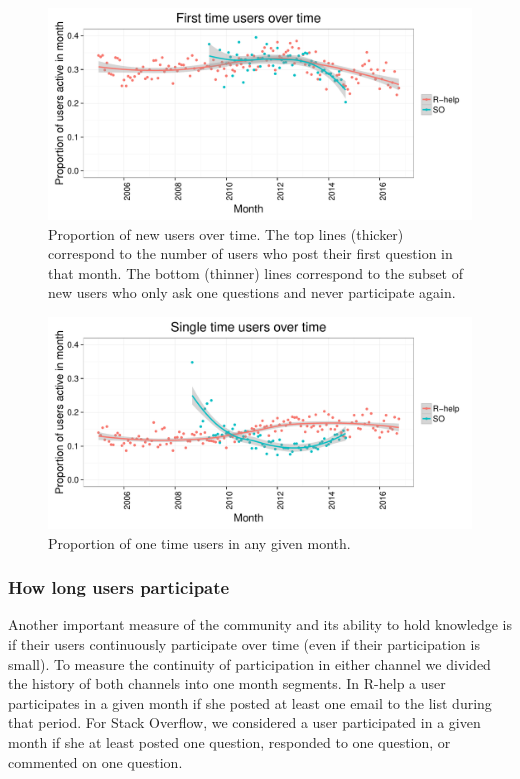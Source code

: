 \documentclass[smallextended]{svjour3}       %
\newcommand{\SO}{Stack Overflow\xspace}
\newcommand{\RH}{R-help\xspace}
\begin{document}
\begin{figure}[htbp]
  \centering
  \includegraphics[width=\textwidth]{figs/actByMonthUsers.pdf}
  \caption{Proportion of new users over time. The top lines (thicker) correspond to
    the number of users who post their first question in that month.
The bottom (thinner) lines  correspond to the subset of new users who only ask one
    questions and never participate again. }
  \label{fig:newusers}
\end{figure}

\begin{figure}[htbp]
  \centering
  \includegraphics[width=\textwidth]{figs/actByMonthUsersOnce.pdf}
  \caption{Proportion of one time users in any given month. }
  \label{fig:newusersOnce}
\end{figure}



\subsubsection{How long users participate}

Another important measure of the community and its ability to hold knowledge is if their users continuously participate
over time (even if their participation is small). To measure the continuity of participation in either
channel we divided the history of both channels into one month segments. In \RH a user participates in a given month if she
posted at least one email to the list during that period. For \SO, we considered a user participated in a given month if she
at least posted one question, responded to one question, or commented on one question.
\end{document}
